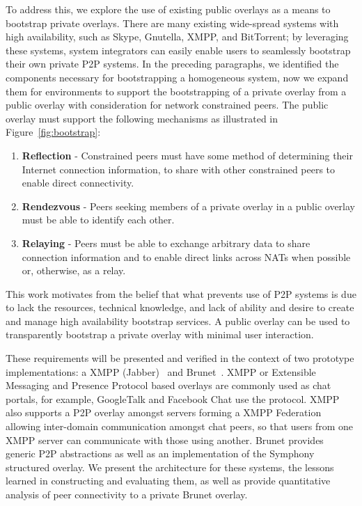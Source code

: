\documentclass[conference]{IEEEtran}
\begin{document}
To address this, we explore the use of existing public overlays as a means to
bootstrap private overlays.  There are many existing wide-spread systems with
high availability, such as Skype, Gnutella, XMPP, and BitTorrent; by leveraging
these systems, system integrators can easily enable users to seamlessly
bootstrap their own private P2P systems.  In the preceding paragraphs, we
identified the components necessary for bootstrapping a homogeneous system, now
we expand them for environments to support the bootstrapping of a private
overlay from a public overlay with consideration for network constrained peers.
The public overlay must support the following mechanisms as illustrated in
Figure~\ref{fig:bootstrap}:
\begin{enumerate}
\item \textbf{Reflection} - Constrained peers must have some method of
determining their Internet connection information, to share with other
constrained peers to enable direct connectivity.
\item \textbf{Rendezvous} - Peers seeking members of a private overlay in a
public overlay must be able to identify each other.
\item \textbf{Relaying} - Peers must be able to exchange arbitrary data to
share connection information and to enable direct links across NATs when
possible or, otherwise, as a relay.
\end{enumerate}
This work motivates from the belief that what prevents use of P2P systems is
due to lack the resources, technical knowledge, and lack of ability and desire
to create and manage high availability bootstrap services.  A public overlay
can be used to transparently bootstrap a private overlay with minimal user
interaction.

These requirements will be presented and verified in the context of two
prototype implementations: a XMPP (Jabber)~\cite{xmpp} and
Brunet~\cite{brunet}.  XMPP or Extensible Messaging and Presence Protocol based
overlays are commonly used as chat portals, for example, GoogleTalk and
Facebook Chat use the protocol.  XMPP also supports a P2P overlay amongst
servers forming a XMPP Federation allowing inter-domain communication amongst
chat peers, so that users from one XMPP server can communicate with those using
another.  Brunet provides generic P2P abstractions as well as an implementation
of the Symphony structured overlay.  We present the architecture for these
systems, the lessons learned in constructing and evaluating them,  as well as
provide quantitative analysis of peer connectivity to a private Brunet overlay.
\end{document}
